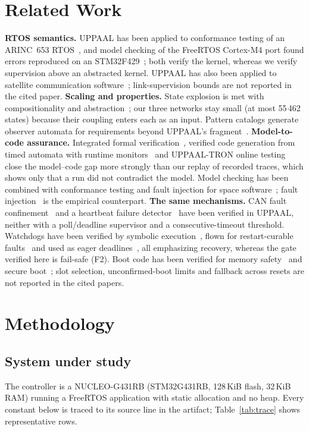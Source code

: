 \documentclass[conference,a4paper]{IEEEtran}
\begin{document}
\section{Related Work}
\textbf{RTOS semantics.} UPPAAL has been applied to conformance testing of an ARINC~653 RTOS~\cite{singh2021}, and model checking of the FreeRTOS Cortex-M4 port found errors reproduced on an STM32F429~\cite{lin2024}; both verify the kernel, whereas we verify supervision above an abstracted kernel. UPPAAL has also been applied to satellite communication software~\cite{alencar2014}; link-supervision bounds are not reported in the cited paper.
\textbf{Scaling and properties.} State explosion is met with compositionality and abstraction~\cite{jensen2000}; our three networks stay small (at most 55\,462 states) because their coupling enters each as an input. Pattern catalogs generate observer automata for requirements beyond UPPAAL's fragment~\cite{vogel2023}.
\textbf{Model-to-code assurance.} Integrated formal verification~\cite{ge2018}, verified code generation from timed automata with runtime monitors~\cite{cho2025} and UPPAAL-TRON online testing~\cite{larsen2005} close the model--code gap more strongly than our replay of recorded traces, which shows only that a run did not contradict the model. Model checking has been combined with conformance testing and fault injection for space software~\cite{pontes2014}; fault injection~\cite{arlat1990,batista2019} is the empirical counterpart.
\textbf{The same mechanisms.} CAN fault confinement~\cite{pan2014} and a heartbeat failure detector~\cite{johansson2020} have been verified in UPPAAL, neither with a poll/deadline supervisor and a consecutive-timeout threshold. Watchdogs have been verified by symbolic execution~\cite{ahmed2018}, flown for restart-curable faults~\cite{cutler2022} and used as eager deadlines~\cite{asch2025}, all emphasizing recovery, whereas the gate verified here is fail-safe (F2). Boot code has been verified for memory safety~\cite{cook2020} and secure boot~\cite{vasudevan2024}; slot selection, unconfirmed-boot limits and fallback across resets are not reported in the cited papers.

\section{Methodology}
\label{sec:method}
\subsection{System under study}
\label{sec:system}
The controller is a NUCLEO-G431RB (STM32G431RB, 128\,KiB flash, 32\,KiB RAM) running a FreeRTOS application with static allocation and no heap. Every constant below is traced to its source line in the artifact; Table~\ref{tab:trace} shows representative rows.
\end{document}
